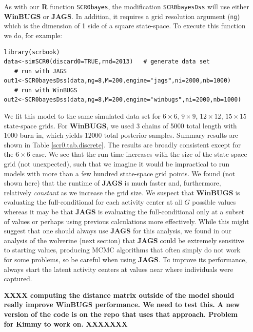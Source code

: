 As with our {\bf R} function \mbox{\tt SCR0bayes}, the modification
\mbox{\tt SCR0bayesDss} will use either {\bf WinBUGS} or {\bf
  JAGS}. In addition, it requires a grid resolution argument
(\mbox{\tt ng}) which is the dimension of 1 side of a square state-space.
To execute this function we do, for example:
{\small
\begin{verbatim}
library(scrbook)
data<-simSCR0(discard0=TRUE,rnd=2013)   # generate data set
   # run with JAGS
out1<-SCR0bayesDss(data,ng=8,M=200,engine="jags",ni=2000,nb=1000)
   # run with WinBUGS
out2<-SCR0bayesDss(data,ng=8,M=200,engine="winbugs",ni=2000,nb=1000)
\end{verbatim}
}
We fit this model to the same simulated data set for $6 \times 6$,
$9 \times 9$, $12 \times 12$, $15\times 15$ state-space grids.  For
{\bf WinBUGS}, we used 3 chains of 5000 total length with 1000
burn-in, which yields 12000 total posterior samples.  Summary results
are shown in Table \ref{scr0.tab.discrete}.  The results are broadly
consistent except for the $6\times 6$ case.  We see that the run time
increases with the size of the state-space grid (not unexpected), such
that we imagine it would be impractical to run models with more than a
few hundred state-space grid points.  We found (not shown here) that
the runtime of {\bf JAGS} is much faster and, furthermore, relatively
{\it constant} as we increase the grid size.  We suspect that {\bf
  WinBUGS} is evaluating the full-conditional for each activity center
at all $G$ possible values whereas it may be that {\bf JAGS} is
evaluating the full-conditional only at a subset of values or perhaps
using previous calculations more effectively.  While this might
suggest that one should always use {\bf JAGS} for this analysis, we
found in our analysis of the wolverine (next section) that {\bf JAGS}
could be extremely sensitive to starting values, producing MCMC
algorithms that often simply do not work for some problems, so be
careful when using {\bf JAGS}. To improve its performance, always
start the latent activity centers at values near where individuals
were captured.


{\bf XXXX computing the distance matrix outside of the model should
  really improve WinBUGS performance. We need to test this. A new
  version of the code is on the repo that uses that approach. Problem
  for Kimmy to work on.
 XXXXXXX}

